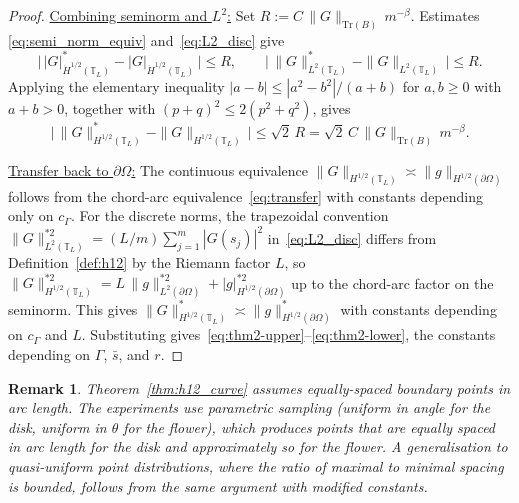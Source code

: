 \documentclass[11pt]{article}
\newtheorem{remark}{Remark}
\begin{document}
\begin{proof}
\smallskip\noindent
\underline{Combining seminorm and $L^2$:}
Set $R := C\,\|G\|_{\mathrm{Tr}(B)}\,m^{-\beta}$. Estimates
\eqref{eq:semi_norm_equiv} and~\eqref{eq:L2_disc} give
\begin{equation*}
  \bigl|\, |G|^*_{\dot{H}^{1/2}(\mathbb{T}_L)}
        - |G|_{\dot{H}^{1/2}(\mathbb{T}_L)} \,\bigr| \le R,
  \qquad
  \bigl|\, \|G\|^*_{L^2(\mathbb{T}_L)}
        - \|G\|_{L^2(\mathbb{T}_L)} \,\bigr| \le R.
\end{equation*}
Applying the elementary inequality $|a - b| \le |a^2 - b^2|/(a + b)$
for $a, b \ge 0$ with $a + b > 0$, together with $(p + q)^2 \le 2(p^2 + q^2)$,
gives
\begin{equation*}
  \bigl|\, \|G\|^*_{H^{1/2}(\mathbb{T}_L)}
        - \|G\|_{H^{1/2}(\mathbb{T}_L)} \,\bigr|
  \le \sqrt{2}\,R
  = \sqrt{2}\,C\,\|G\|_{\mathrm{Tr}(B)}\,m^{-\beta}.
\end{equation*}

\smallskip\noindent
\underline{Transfer back to $\partial\Omega$:}
The continuous equivalence
$\|G\|_{H^{1/2}(\mathbb{T}_L)} \asymp \|g\|_{H^{1/2}(\partial\Omega)}$
follows from the chord-arc equivalence~\eqref{eq:transfer} with
constants depending only on $c_\Gamma$. For the discrete norms, the
trapezoidal convention $\|G\|^{*2}_{L^2(\mathbb{T}_L)}
= (L/m)\sum_{j=1}^m |G(s_j)|^2$ in~\eqref{eq:L2_disc} differs from
Definition~\ref{def:h12} by the Riemann factor $L$, so
$\|G\|^{*2}_{H^{1/2}(\mathbb{T}_L)}
= L\,\|g\|^{*2}_{L^2(\partial\Omega)}
+ |g|^{*2}_{H^{1/2}(\partial\Omega)}$ up to the chord-arc factor on
the seminorm. This gives $\|G\|^*_{H^{1/2}(\mathbb{T}_L)} \asymp
\|g\|^*_{H^{1/2}(\partial\Omega)}$ with constants depending on
$c_\Gamma$ and $L$. Substituting
gives~\eqref{eq:thm2-upper}--\eqref{eq:thm2-lower}, the constants
depending on $\Gamma$, $\bar{s}$, and $r$.
\end{proof}


\begin{remark}\label{rem:quasiuniform}
Theorem~\ref{thm:h12_curve} assumes equally-spaced boundary points
in arc length. The experiments use parametric sampling (uniform in
angle for the disk, uniform in $\theta$ for the flower), which
produces points that are equally spaced in arc length for the disk
and approximately so for the flower. A generalisation to
quasi-uniform point distributions, where the ratio of maximal to
minimal spacing is bounded, follows from the same argument with
modified constants.
\end{remark}
 
\end{document}
